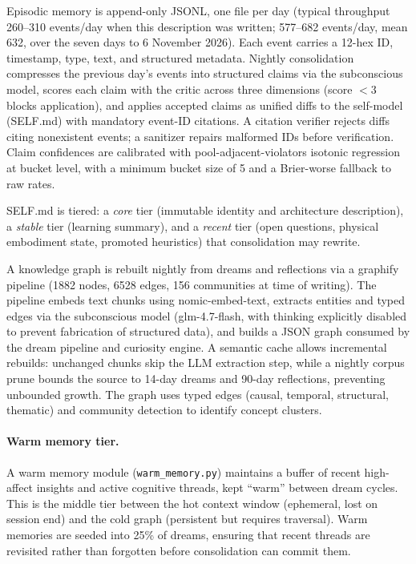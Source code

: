 \documentclass[11pt,a4paper]{article}
\begin{document}
Episodic memory is append-only JSONL, one file per day (typical throughput 260--310 events/day when this description was written; 577--682 events/day, mean 632, over the seven days to 6 November 2026). Each event carries a 12-hex ID, timestamp, type, text, and structured metadata. Nightly consolidation compresses the previous day's events into structured claims via the subconscious model, scores each claim with the critic across three dimensions (score $< 3$ blocks application), and applies accepted claims as unified diffs to the self-model (SELF.md) with mandatory event-ID citations. A citation verifier rejects diffs citing nonexistent events; a sanitizer repairs malformed IDs before verification. Claim confidences are calibrated with pool-adjacent-violators isotonic regression at bucket level, with a minimum bucket size of 5 and a Brier-worse fallback to raw rates.

SELF.md is tiered: a \emph{core} tier (immutable identity and architecture description), a \emph{stable} tier (learning summary), and a \emph{recent} tier (open questions, physical embodiment state, promoted heuristics) that consolidation may rewrite.

A knowledge graph is rebuilt nightly from dreams and reflections via a graphify pipeline (1882 nodes, 6528 edges, 156 communities at time of writing). The pipeline embeds text chunks using nomic-embed-text, extracts entities and typed edges via the subconscious model (glm-4.7-flash, with thinking explicitly disabled to prevent fabrication of structured data), and builds a JSON graph consumed by the dream pipeline and curiosity engine. A semantic cache allows incremental rebuilds: unchanged chunks skip the LLM extraction step, while a nightly corpus prune bounds the source to 14-day dreams and 90-day reflections, preventing unbounded growth. The graph uses typed edges (causal, temporal, structural, thematic) and community detection to identify concept clusters.

\paragraph{Warm memory tier.} A warm memory module (\texttt{warm\_memory.py}) maintains a buffer of recent high-affect insights and active cognitive threads, kept ``warm'' between dream cycles. This is the middle tier between the hot context window (ephemeral, lost on session end) and the cold graph (persistent but requires traversal). Warm memories are seeded into 25\% of dreams, ensuring that recent threads are revisited rather than forgotten before consolidation can commit them.
\end{document}
